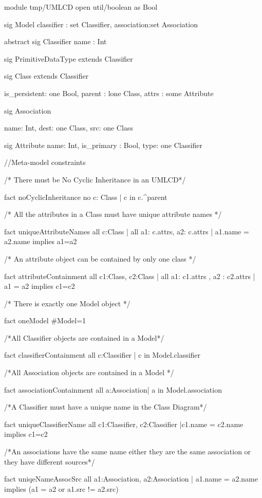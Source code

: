 
module tmp/UMLCD
open util/boolean as Bool

sig Model
{
	classifier : set Classifier,
	association:set Association
}


abstract sig Classifier
{
	name :  Int
}

sig PrimitiveDataType extends Classifier 
{ }

sig Class extends Classifier
{
	is_persistent: one Bool,
	parent : lone Class,
	attrs : some Attribute

}

sig Association

{
	name: Int,
	dest: one Class,
	src: one Class

}

sig Attribute
{
	name: Int,
	is_primary : Bool,
	type: one Classifier
}

//Meta-model constraints

/* There must be No Cyclic Inheritance in an UMLCD*/

fact noCyclicInheritance 
{
	no c: Class | c in c.^parent
}

/* All the attributes in a Class must have unique attribute names */

fact uniqueAttributeNames 
{
	all c:Class | all a1:  c.attrs, a2: c.attrs | a1.name = a2.name implies a1=a2
}

/* An attribute object can be contained by only one class */

fact attributeContainment 
{
	all c1:Class, c2:Class | all a1: c1.attrs , a2 : c2.attrs | a1 = a2 implies c1=c2
}

/* There is exactly one Model object */

fact oneModel 
{
	#Model=1
}

/*All Classifier objects are contained in a Model*/

fact classifierContainment 
{
	all c:Classifier | c in Model.classifier
}

/*All Association objects are contained in a Model */

fact associationContainment 
{
all a:Association| a in Model.association
}

/*A Classifier must have a unique name in the Class Diagram*/

fact uniqueClassifierName 
{
	all c1:Classifier, c2:Classifier |c1.name = c2.name implies c1=c2
}

/*An associations have the same name either they are the same association or they have different sources*/

fact uniqeNameAssocSrc 
{
	all a1:Association, a2:Association |
	a1.name = a2.name implies (a1 = a2 or a1.src != a2.src)
}
